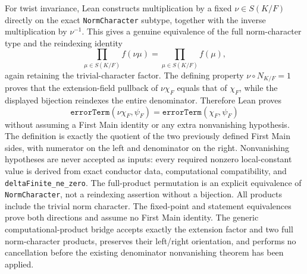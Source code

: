 \begin{definition}
For twist invariance, Lean constructs multiplication by a fixed
$\nu\in S(K/F)$ directly on the exact \texttt{NormCharacter} subtype,
together with the inverse multiplication by $\nu^{-1}$.  This gives a
genuine equivalence of the full norm-character type and the reindexing
identity
\[
 \prod_{\mu\in S(K/F)} f(\nu\mu)
 =\prod_{\mu\in S(K/F)} f(\mu),
\]
again retaining the trivial-character factor.  The defining property
$\nu\circ N_{K/F}=1$ proves that the extension-field pullback of
$\nu\chi_F$ equals that of $\chi_F$, while the displayed bijection reindexes
the entire denominator.  Therefore Lean proves
\[
 \texttt{errorTerm}(\nu\chi_F,\psi_F)
 =\texttt{errorTerm}(\chi_F,\psi_F)
\]
without assuming a First Main identity or any extra nonvanishing hypothesis.
\leanok
{}
\FormalizationContract The definition is exactly the quotient of the two
previously defined First Main sides, with numerator on the left and
denominator on the right.  Nonvanishing hypotheses are never accepted as
inputs: every required nonzero local-constant value is derived from exact
conductor data, computational compatibility, and
\texttt{deltaFinite\_ne\_zero}.  The full-product permutation is an explicit
equivalence of \texttt{NormCharacter}, not a reindexing assertion without a
bijection.  All products include the trivial norm character.  The fixed-point
and statement equivalences prove both directions and assume no First Main
identity.  The generic computational-product bridge accepts exactly the
extension factor and two full norm-character products, preserves their
left/right orientation, and performs no cancellation before the existing
denominator nonvanishing theorem has been applied.
\end{definition}
